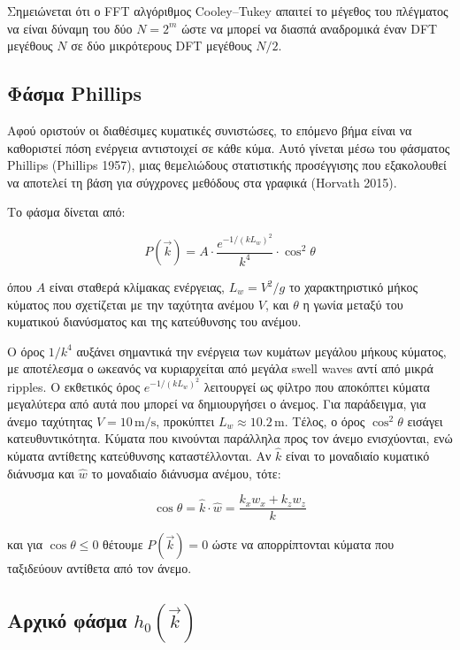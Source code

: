 \documentclass[a4paper, 11pt]{article}
\begin{document}
Σημειώνεται ότι ο FFT αλγόριθμος Cooley--Tukey απαιτεί το μέγεθος του
πλέγματος να είναι δύναμη του δύο \(N = 2^m\) ώστε να μπορεί να διασπά
αναδρομικά έναν DFT μεγέθους \(N\) σε δύο μικρότερους DFT μεγέθους
\(N/2\).

\subsection{Φάσμα Phillips}\label{ux3c6ux3acux3c3ux3bcux3b1-phillips}

Αφού οριστούν οι διαθέσιμες κυματικές συνιστώσες, το επόμενο βήμα είναι
να καθοριστεί πόση ενέργεια αντιστοιχεί σε κάθε κύμα. Αυτό γίνεται μέσω
του φάσματος Phillips (Phillips 1957), μιας θεμελιώδους στατιστικής
προσέγγισης που εξακολουθεί να αποτελεί τη βάση για σύγχρονες μεθόδους
στα γραφικά (Horvath 2015).

Το φάσμα δίνεται από:

\[
P(\vec{k}) =
A
\cdot
\frac{e^{-1/(kL_w)^2}}{k^4}
\cdot
\cos^2\theta
\]

όπου \(A\) είναι σταθερά κλίμακας ενέργειας, \(L_w = V^2/g\) το
χαρακτηριστικό μήκος κύματος που σχετίζεται με την ταχύτητα ανέμου
\(V\), και \(\theta\) η γωνία μεταξύ του κυματικού διανύσματος και της
κατεύθυνσης του ανέμου.

Ο όρος \(1/k^4\) αυξάνει σημαντικά την ενέργεια των κυμάτων μεγάλου
μήκους κύματος, με αποτέλεσμα ο ωκεανός να κυριαρχείται από μεγάλα swell
waves αντί από μικρά ripples. Ο εκθετικός όρος \(e^{-1/(kL_w)^2}\)
λειτουργεί ως φίλτρο που αποκόπτει κύματα μεγαλύτερα από αυτά που μπορεί
να δημιουργήσει ο άνεμος. Για παράδειγμα, για άνεμο ταχύτητας
\(V=10\,\text{m/s}\), προκύπτει \(L_w \approx 10.2\,\text{m}\). Τέλος, ο
όρος \(\cos^2\theta\) εισάγει κατευθυντικότητα. Κύματα που κινούνται
παράλληλα προς τον άνεμο ενισχύονται, ενώ κύματα αντίθετης κατεύθυνσης
καταστέλλονται. Αν \(\hat{k}\) είναι το μοναδιαίο κυματικό διάνυσμα και
\(\hat{w}\) το μοναδιαίο διάνυσμα ανέμου, τότε:

\[
\cos\theta
=
\hat{k}\cdot\hat{w}
=
\frac{k_xw_x + k_zw_z}{k}
\]

και για \(\cos\theta \le 0\) θέτουμε \(P(\vec{k}) = 0\) ώστε να
απορρίπτονται κύματα που ταξιδεύουν αντίθετα από τον άνεμο.

\subsection{\texorpdfstring{Αρχικό φάσμα
\(h_0(\vec{k})\)}{Αρχικό φάσμα h\_0(\textbackslash vec\{k\})}}\label{ux3b1ux3c1ux3c7ux3b9ux3baux3cc-ux3c6ux3acux3c3ux3bcux3b1-h_0veck}
\end{document}
